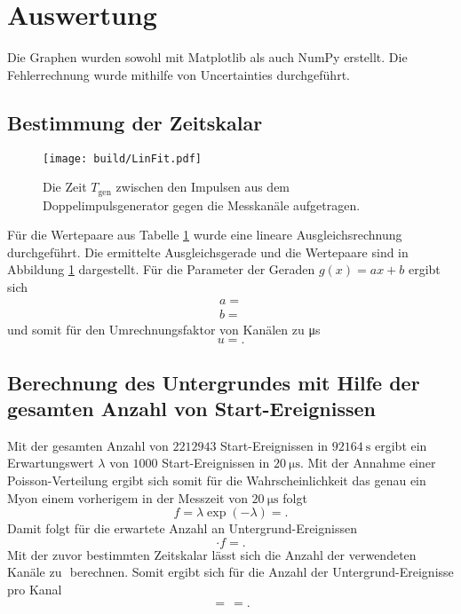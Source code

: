 \section{Auswertung}
\label{sec:Auswertung}


Die Graphen wurden sowohl mit Matplotlib \cite{matplotlib} als auch NumPy \cite{numpy} erstellt. Die
Fehlerrechnung wurde mithilfe von Uncertainties \cite{uncertainties} durchgeführt.


\subsection{Bestimmung der Zeitskalar}
\begin{figure}
	\centering
	\texttt{[image: build/LinFit.pdf]}
	\caption{Die Zeit $T_\text{gen}$ zwischen den Impulsen aus dem Doppelimpulsgenerator gegen die Messkanäle aufgetragen.}
	\label{fig:erste}
\end{figure}
Für die Wertepaare aus Tabelle \ref{sec:Auswertung}  wurde eine lineare Ausgleichsrechnung durchgeführt. Die ermittelte Ausgleichsgerade und die Wertepaare sind in Abbildung \ref{fig:erste} dargestellt. Für die Parameter der Geraden $g(x)=a x + b$ ergibt sich
\begin{gather*}
a=\num{}\\
b=\num{}
\end{gather*}
und somit für den Umrechnungsfaktor von Kanälen zu \si{\micro\second}
\begin{displaymath}
u=\num{}.
\end{displaymath}

\subsection{Berechnung des Untergrundes mit Hilfe der gesamten Anzahl von Start-Ereignissen}
Mit der gesamten Anzahl von $\num{2212943}$ Start-Ereignissen in $\SI{92164}{\second}$ ergibt ein Erwartungswert $\lambda$ von $\num{1000}$ Start-Ereignissen in $\SI{20}{\micro\second}$. Mit der Annahme einer Poisson-Verteilung ergibt sich somit für die Wahrscheinlichkeit das genau ein Myon einem vorherigem in der Messzeit von $\SI{20}{\micro\second}$ folgt 
\begin{displaymath}
f=\lambda \exp(-\lambda)=\num{}.
\end{displaymath}
Damit folgt für die erwartete Anzahl an Untergrund-Ereignissen
\begin{displaymath}
\cdot f =\num{}.
\end{displaymath}
Mit der zuvor bestimmten Zeitskalar lässt sich die Anzahl der verwendeten Kanäle zu $\num{}$ berechnen.
Somit ergibt sich für die Anzahl der Untergrund-Ereignisse pro Kanal
\begin{displaymath}
=\frac{}{} =\num{}.
\end{displaymath}


